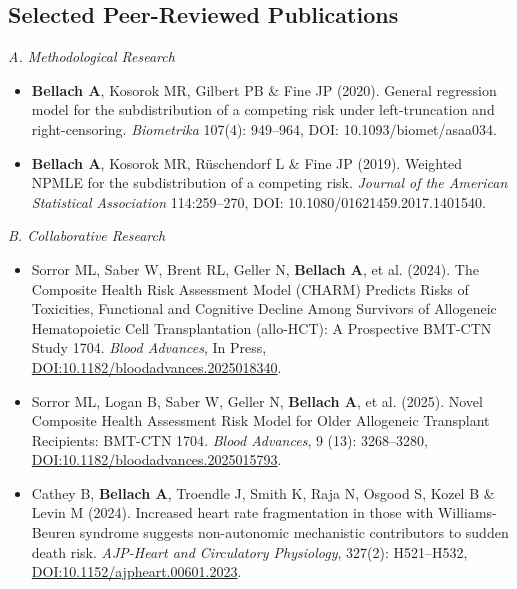 \documentclass[a4paper,11pt]{article}
\begin{document}
\subsection*{\large Selected Peer-Reviewed Publications}
\vspace{-0.3ex}
{\em A. Methodological Research}
\begin{itemize}
\vspace{-0.6ex}
\item[$1.$] {\bf Bellach A}, Kosorok MR, Gilbert PB \& Fine JP (2020). {General regression model for the subdistribution of a competing risk under left-truncation and right-censoring}. {\em Biometrika} 107(4): 949--964, DOI: 10.1093/biomet/asaa034.
%
\vspace{-0.6ex}
\item[$2.$] {\bf Bellach A}, Kosorok MR, R\"uschendorf L \& Fine JP (2019). {Weighted NPMLE for the subdistribution of a competing risk}. {\em Journal of the American Statistical Association} 114:259--270, DOI: 10.1080/01621459.2017.1401540.
\end{itemize}
{\em B. Collaborative Research}
\begin{itemize}
\vspace{-0.6ex}
\item[$3.$] Sorror ML, Saber W, Brent RL, Geller N, {\bf Bellach A}, et al. (2024). {The Composite Health Risk Assessment Model (CHARM) Predicts Risks of Toxicities, Functional and Cognitive Decline Among Survivors of Allogeneic Hematopoietic Cell Transplantation (allo-HCT): A Prospective BMT-CTN Study 1704}. {\em Blood Advances}, In Press, \href{https://doi.org/10.1182/bloodadvances.2025018340}{DOI:10.1182/bloodadvances.2025018340}.
\vspace{-0.6ex}
\item[$4.$] Sorror ML, Logan B, Saber W, Geller N, {\bf Bellach A}, et al. (2025).
{Novel Composite Health Assessment Risk Model for Older Allogeneic Transplant Recipients: BMT-CTN 1704}. {\em Blood Advances}, 9 (13): 3268--3280, \href{https://doi.org/10.1182/bloodadvances.2025015793}{DOI:10.1182/bloodadvances.2025015793}.
\vspace{-0.6ex}
\item[$5.$] Cathey B, {\bf Bellach A}, Troendle J, Smith K, Raja N, Osgood S, Kozel B \& Levin M (2024). {Increased heart rate fragmentation in those with Williams-Beuren syndrome suggests non-autonomic mechanistic contributors to sudden death risk}. {\em AJP-Heart and Circulatory Physiology}, 327(2): H521--H532, \href{https://doi.org/10.1152/ajpheart.00601.2023}{DOI:10.1152/ajpheart.00601.2023}.	
\end{itemize}
\vspace{-0.4cm}
\end{document}

